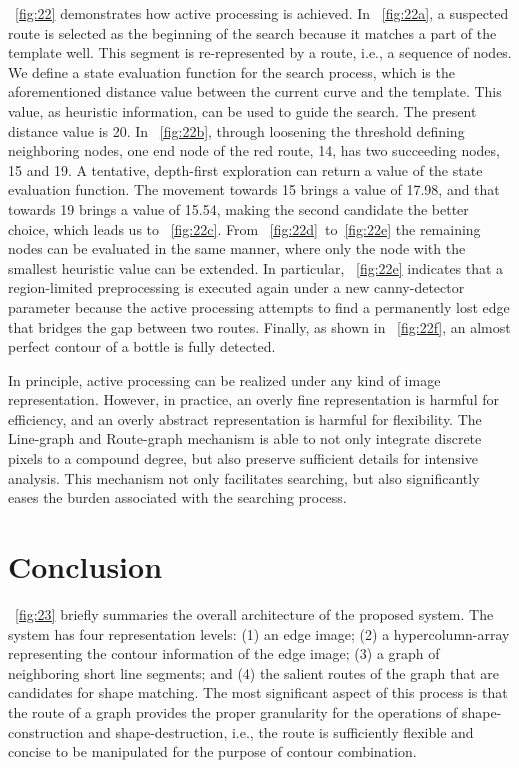 \documentclass[journal]{IEEEtran}
\begin{document}
\figurename~\ref{fig:22} demonstrates how active processing is achieved. 
In \figurename~\ref{fig:22a}, a suspected route is selected as the beginning of the search because it matches a part of the template well. 
This segment is re-represented by a route, i.e., a sequence of nodes. 
We define a state evaluation function for the search process, 
which is the aforementioned distance value between the current curve and the template. 
This value, as heuristic information, can be used to guide the search. 
The present distance value is 20. 
In \figurename~\ref{fig:22b}, through loosening the threshold defining neighboring nodes, 
one end node of the red route, 14, has two succeeding nodes, 15 and 19. 
A tentative, depth-first exploration can return a value of the state evaluation function. 
The movement towards 15 brings a value of 17.98, and that towards 19 brings a value of 15.54, 
making the second candidate the better choice, which leads us to \figurename~\ref{fig:22c}. 
From \figurename~\ref{fig:22d}~to~\ref{fig:22e} the remaining nodes can be evaluated in the same manner, 
where only the node with the smallest heuristic value can be extended. 
In particular, \figurename~\ref{fig:22e} indicates that a region-limited preprocessing is executed again under a new canny-detector parameter because the active processing attempts to find a permanently lost edge that bridges the gap between two routes. 
Finally, as shown in \figurename~\ref{fig:22f}, an almost perfect contour of a bottle is fully detected.

In principle, active processing can be realized under any kind of image representation. 
However, in practice, an overly fine representation is harmful for efficiency, 
and an overly abstract representation is harmful for flexibility. 
The Line-graph and Route-graph mechanism is able to not only integrate discrete pixels to a compound degree, 
but also preserve sufficient details for intensive analysis. 
This mechanism not only facilitates searching, 
but also significantly eases the burden associated with the searching process.

\section{Conclusion}

\figurename~\ref{fig:23} briefly summaries the overall architecture of the proposed system. 
The system has four representation levels: 
(1) an edge image; (2) a hypercolumn-array representing the contour information of the edge image; 
(3) a graph of neighboring short line segments; 
and (4) the salient routes of the graph that are candidates for shape matching. 
The most significant aspect of this process is that the route of a graph provides the proper granularity for the operations of shape-construction and shape-destruction, i.e., the route is sufficiently flexible and concise to be manipulated for the purpose of contour combination.
\end{document}
